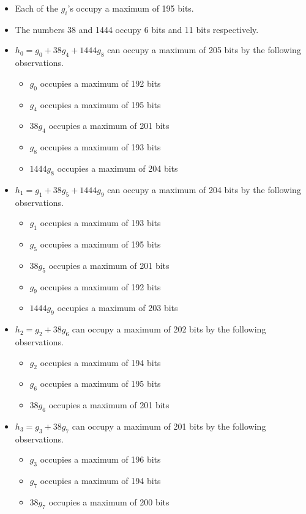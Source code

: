 \documentclass[a4paper, 12pt]{article}
\begin{document}
\begin{itemize}
  \item Each of the $g_i$'s occupy a maximum of 195 bits.
  \item The numbers 38 and 1444 occupy 6 bits and 11 bits respectively.
  \item $h_0 = g_0 + 38 g_4 + 1444 g_8$ can occupy a maximum of 205 bits by the following observations.
    \begin{itemize}
      \item $g_0$ occupies a maximum of 192 bits
      \item $g_4$ occupies a maximum of 195 bits
      \item $38g_4$ occupies a maximum of 201 bits
      \item $g_8$ occupies a maximum of 193 bits
      \item $1444g_8$ occupies a maximum of 204 bits
    \end{itemize}
  \item $h_1 = g_1 + 38 g_5 + 1444 g_9$ can occupy a maximum of 204 bits by the following observations.
    \begin{itemize}
      \item $g_1$ occupies a maximum of 193 bits
      \item $g_5$ occupies a maximum of 195 bits
      \item $38g_5$ occupies a maximum of 201 bits
      \item $g_9$ occupies a maximum of 192 bits
      \item $1444g_9$ occupies a maximum of 203 bits
    \end{itemize}
  \item $h_2 = g_2 + 38 g_6$ can occupy a maximum of 202 bits by the following observations.
    \begin{itemize}
      \item $g_2$ occupies a maximum of 194 bits
      \item $g_6$ occupies a maximum of 195 bits
      \item $38g_6$ occupies a maximum of 201 bits
    \end{itemize}
  \item $h_3 = g_3 + 38 g_7$ can occupy a maximum of 201 bits by the following observations.
    \begin{itemize}
      \item $g_3$ occupies a maximum of 196 bits
      \item $g_7$ occupies a maximum of 194 bits
      \item $38g_7$ occupies a maximum of 200 bits

\end{itemize}
\end{itemize}
\end{document}
